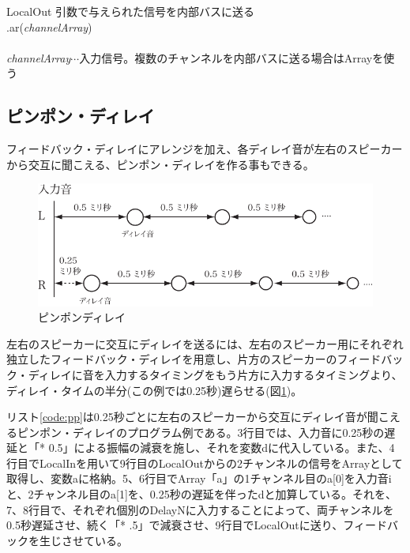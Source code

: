 \documentclass{jsarticle}
\begin{document}
\begin{itembox}[l]{LocalOut}
	{\footnotesize 
	引数で与えられた信号を内部バスに送る\\
	.ar({\it channelArray})\\\\
	{\it channelArray}$\cdots$入力信号。複数のチャンネルを内部バスに送る場合はArrayを使う\\
	}
\end{itembox}

\subsection{ピンポン・ディレイ}
フィードバック・ディレイにアレンジを加え、各ディレイ音が左右のスピーカーから交互に聞こえる、ピンポン・ディレイを作る事もできる。

\begin{figure}[htbp]
	\begin{center}
		\includegraphics[scale=0.65]{pingpong.pdf}
	\end{center}
	\caption{ピンポンディレイ}
	\label{fig:pingpong}
\end{figure}

左右のスピーカーに交互にディレイを送るには、左右のスピーカー用にそれぞれ独立したフィードバック・ディレイを用意し、片方のスピーカーのフィードバック・ディレイに音を入力するタイミングをもう片方に入力するタイミングより、ディレイ・タイムの半分(この例では0.25秒)遅らせる(図\ref{fig:pingpong})。

リスト\ref{code:pp}は0.25秒ごとに左右のスピーカーから交互にディレイ音が聞こえるピンポン・ディレイのプログラム例である。3行目では、入力音に0.25秒の遅延と「* 0.5」による振幅の減衰を施し、それを変数dに代入している。また、4行目でLocalInを用いて9行目のLocalOutからの2チャンネルの信号をArrayとして取得し、変数aに格納。5、6行目でArray「a」の1チャンネル目のa[0]を入力音iと、2チャンネル目のa[1]を、0.25秒の遅延を伴ったdと加算している。それを、7、8行目で、それぞれ個別のDelayNに入力することによって、両チャンネルを0.5秒遅延させ、続く「* .5」で減衰させ、9行目でLocalOutに送り、フィードバックを生じさせている。
\end{document}
